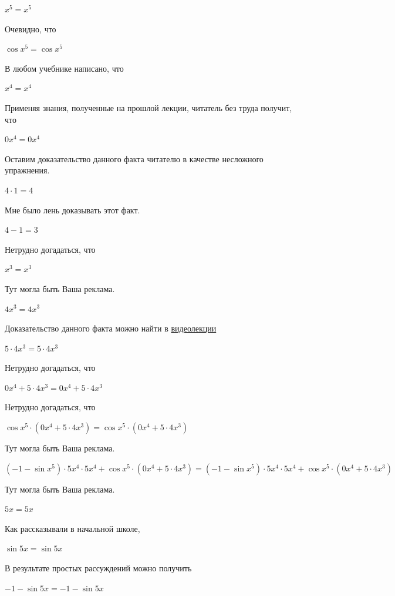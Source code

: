 \documentclass[12pt,a4paper,fleqn]{article}
\theoremstyle{definition}
\begin{document}
${ x }^{ 5 } = { x }^{ 5 }$

Очевидно, что 

$\cos{ x }^{ 5 } = \cos{ x }^{ 5 }$

В любом учебнике написано, что 

${ x }^{ 4 } = { x }^{ 4 }$

Применяя знания, полученные на прошлой лекции, читатель без труда получит, что 

$ 0 { x }^{ 4 } =  0 { x }^{ 4 }$

Оставим доказательство данного факта читателю в качестве несложного упражнения. 

$ 4  \cdot  1  =  4 $

Мне было лень доказывать этот факт.

$ 4  -  1  =  3 $

Нетрудно догадаться, что 

${ x }^{ 3 } = { x }^{ 3 }$

Тут могла быть Ваша реклама. 

$ 4 { x }^{ 3 } =  4 { x }^{ 3 }$

Доказательство данного факта можно найти в \href{https://www.youtube.com/watch?v=dQw4w9WgXcQ}{видеолекции} 

$ 5  \cdot  4 { x }^{ 3 } =  5  \cdot  4 { x }^{ 3 }$

Нетрудно догадаться, что 

$ 0 { x }^{ 4 } +  5  \cdot  4 { x }^{ 3 } =  0 { x }^{ 4 } +  5  \cdot  4 { x }^{ 3 }$

Нетрудно догадаться, что 

$\cos{ x }^{ 5 } \cdot ( 0 { x }^{ 4 } +  5  \cdot  4 { x }^{ 3 }) = \cos{ x }^{ 5 } \cdot ( 0 { x }^{ 4 } +  5  \cdot  4 { x }^{ 3 })$

Тут могла быть Ваша реклама. 

$( -1  - \sin{ x }^{ 5 }) \cdot  5 { x }^{ 4 } \cdot  5 { x }^{ 4 } + \cos{ x }^{ 5 } \cdot ( 0 { x }^{ 4 } +  5  \cdot  4 { x }^{ 3 }) = ( -1  - \sin{ x }^{ 5 }) \cdot  5 { x }^{ 4 } \cdot  5 { x }^{ 4 } + \cos{ x }^{ 5 } \cdot ( 0 { x }^{ 4 } +  5  \cdot  4 { x }^{ 3 })$

Тут могла быть Ваша реклама. 

$ 5  x  =  5  x $

Как рассказывали в начальной школе, 

$\sin 5  x  = \sin 5  x $

В результате простых рассуждений можно получить 

$ -1  - \sin 5  x  =  -1  - \sin 5  x $
\end{document}
